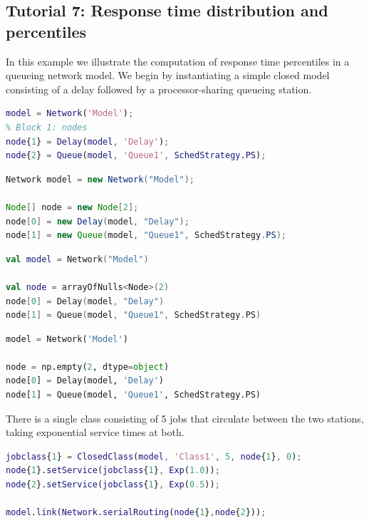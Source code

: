\subsection{Tutorial 7: Response time distribution and percentiles}
\label{example-7-response-time-distribution-and-percentiles}
In this example we illustrate the computation of response time percentiles in a queueing network model. We begin by instantiating a simple closed model consisting of a delay followed by a processor-sharing queueing station.
\begin{MATLAB}
\begin{lstlisting}[language = matlab]
model = Network('Model');
% Block 1: nodes
node{1} = Delay(model, 'Delay');
node{2} = Queue(model, 'Queue1', SchedStrategy.PS);
\end{lstlisting}
\end{MATLAB}
\begin{JAVA}
\begin{lstlisting}[language = java, basicstyle=\ttfamily\scriptsize]
Network model = new Network("Model");

Node[] node = new Node[2];
node[0] = new Delay(model, "Delay");
node[1] = new Queue(model, "Queue1", SchedStrategy.PS);
\end{lstlisting}
\end{JAVA}
\begin{KOTLIN}
\begin{lstlisting}[language = kotlin, basicstyle=\ttfamily\scriptsize]
val model = Network("Model")

val node = arrayOfNulls<Node>(2)
node[0] = Delay(model, "Delay")
node[1] = Queue(model, "Queue1", SchedStrategy.PS)
\end{lstlisting}
\end{KOTLIN}
\begin{PYTHON}
\begin{lstlisting}[language = python]
model = Network('Model')

node = np.empty(2, dtype=object)
node[0] = Delay(model, 'Delay')
node[1] = Queue(model, 'Queue1', SchedStrategy.PS)
\end{lstlisting}
\end{PYTHON}
There is a single class consisting of 5 jobs that circulate between the two stations, taking exponential service times at both.
\begin{MATLAB}
\begin{lstlisting}[language = matlab]
jobclass{1} = ClosedClass(model, 'Class1', 5, node{1}, 0);
node{1}.setService(jobclass{1}, Exp(1.0));
node{2}.setService(jobclass{1}, Exp(0.5));

model.link(Network.serialRouting(node{1},node{2}));
\end{lstlisting}
\end{MATLAB}
